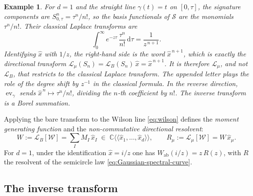 \documentclass[11pt,a4paper]{article}
\newtheorem{example}[theorem]{Example}
\DeclareMathOperator{\ev}{ev}
\newcommand{\xh}{\hat{x}}
\newcommand{\cW}{\mathcal{W}}
\newcommand{\cL}{\mathcal{L}}
\newcommand{\dd}{\mathrm{d}}
\begin{document}
\begin{example}\label{ex:classical}
For $d=1$ and the straight line $\gamma(t)=t$ on $[0,\tau]$, the signature components are $S^{n}_{0,\tau}=\tau^n/n!$, so the basis functionals of $\mathcal S$ are the monomials $\tau^n/n!$. Their classical Laplace transforms are
\begin{equation*}
  \int_0^\infty e^{-z\tau}\,\frac{\tau^n}{n!}\,\dd\tau
  = \frac{1}{z^{\,n+1}}.
\end{equation*}
Identifying $\xh$ with $1/z$, the right-hand side is the word $\xh^{\,n+1}$, which is exactly the directional transform $\cL_\mu(S_n)=\cL_B(S_n)\,\xh=\xh^{\,n+1}$. It is therefore $\cL_\mu$, and not $\cL_B$, that restricts to the classical Laplace transform. The appended letter plays the role of the degree shift by $z^{-1}$ in the classical formula. In the reverse direction, $\ev_\gamma$ sends $\xh^{\,n}\mapsto\tau^n/n!$, dividing the $n$-th coefficient by $n!$. The inverse transform is a Borel summation.
\end{example}

Applying the bare transform to the Wilson line \eqref{eq:wilson} defines the \emph{moment generating function} and the \emph{non-commutative directional resolvent}:
\begin{equation}\label{eq:R-nc}
  W := \cL_B[\cW] = \sum_{I} M_{I}\,\xh_I \;\in\;\mathbb{C}\langle\langle\xh_1,\ldots,\xh_d\rangle\rangle,\qquad
  R_\mu := \cL_\mu[\cW] = W\,\xh_\mu .
\end{equation}
For $d=1$, under the identification $\xh=i/z$ one has $W_{\mathrm{ab}}(i/z)=z\,R(z)$, with $R$ the resolvent of the semicircle law  \eqref{eq:Gaussian-spectral-curve}.



\subsection{The inverse transform}\label{sec:inverse}
\end{document}
